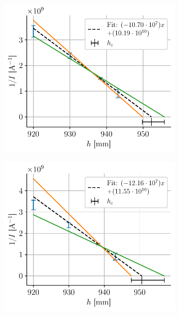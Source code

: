 \begin{figure}[H]
\begin{subfigure}{0.48\linewidth}
        \includegraphics[width=\linewidth]{figures/h_I_pair23.pdf}
        \caption{}
        \label{fig:hc_I_23}
    \end{subfigure}
    \begin{subfigure}{0.48\linewidth}
        \centering
        \includegraphics[width=\linewidth]{figures/h_I_pair34.pdf}
        \caption{}
        \label{fig:hc_I_34}
    \end{subfigure}
    \begin{subfigure}{0.48\linewidth}

\end{subfigure}
\end{figure}
